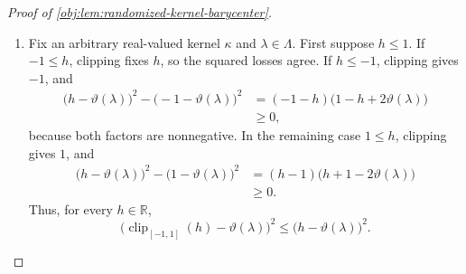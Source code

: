\begin{proof}[Proof of \cref{obj:lem:randomized-kernel-barycenter}]
\begin{enumerate}
The deterministic-kernel construction gives the first comparison:
\[
\inf_{\kappa\in\mathcal K_{\mathrm{bd}}}
\sup_{\lambda\in\Lambda}\mathcal R_{\mathrm{bd}}(\kappa,\lambda)
\le
\inf_{b\in\mathcal B_{\mathrm{det}}}
\sup_{\lambda\in\Lambda}\mathcal R_{\mathrm{det}}(b,\lambda).
\]
Conversely, each
\(\kappa\in\mathcal K_{\mathrm{bd}}\) has the barycenter map
\(b_\kappa\in\mathcal B_{\mathrm{det}}\), whose pointwise risk inequality gives
\[
\sup_{\lambda\in\Lambda}\mathcal R_{\mathrm{det}}(b_\kappa,\lambda)
\le
\sup_{\lambda\in\Lambda}\mathcal R_{\mathrm{bd}}(\kappa,\lambda).
\]
For a nonempty parameter set this follows from monotonicity of bounded
suprema; for an empty parameter set both sides equal zero. Taking infima gives
\[
\inf_{b\in\mathcal B_{\mathrm{det}}}
\sup_{\lambda\in\Lambda}\mathcal R_{\mathrm{det}}(b,\lambda)
\le
\inf_{\kappa\in\mathcal K_{\mathrm{bd}}}
\sup_{\lambda\in\Lambda}\mathcal R_{\mathrm{bd}}(\kappa,\lambda).
\]
The two comparisons establish the asserted equality. %

\item Fix an arbitrary real-valued kernel \(\kappa\) and
\(\lambda\in\Lambda\). First suppose \(h\le1\). If \(-1\le h\), clipping fixes
\(h\), so the squared losses agree. If \(h\le-1\), clipping gives \(-1\), and
\[
\begin{aligned}
\bigl(h-\vartheta(\lambda)\bigr)^2
-\bigl(-1-\vartheta(\lambda)\bigr)^2
&=(-1-h)\bigl(1-h+2\vartheta(\lambda)\bigr)\\
&\ge0,
\end{aligned}
\]
because both factors are nonnegative. In the remaining case \(1\le h\),
clipping gives \(1\), and
\[
\begin{aligned}
\bigl(h-\vartheta(\lambda)\bigr)^2
-\bigl(1-\vartheta(\lambda)\bigr)^2
&=(h-1)\bigl(h+1-2\vartheta(\lambda)\bigr)\\
&\ge0.
\end{aligned}
\]
Thus, for every \(h\in\mathbb R\),
\[
\bigl(\operatorname{clip}_{[-1,1]}(h)-\vartheta(\lambda)\bigr)^2
\le
\bigl(h-\vartheta(\lambda)\bigr)^2.
\]


\end{enumerate}
\end{proof}
